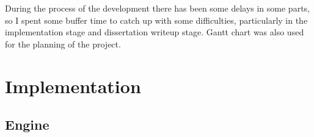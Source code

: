\documentclass[12pt,a4paper,twoside,openright]{report}
\begin{document}
During the process of the development there has been some delays in some parts, so I spent some buffer time to catch up with some difficulties, particularly in the implementation stage and dissertation writeup stage. Gantt chart was also used for the planning of the project.

\begin{figure}\begin{center}
\end{center}\end{figure}

\chapter{Implementation}\label{chap3}

\section{Engine}\label{englbl}
\end{document}
